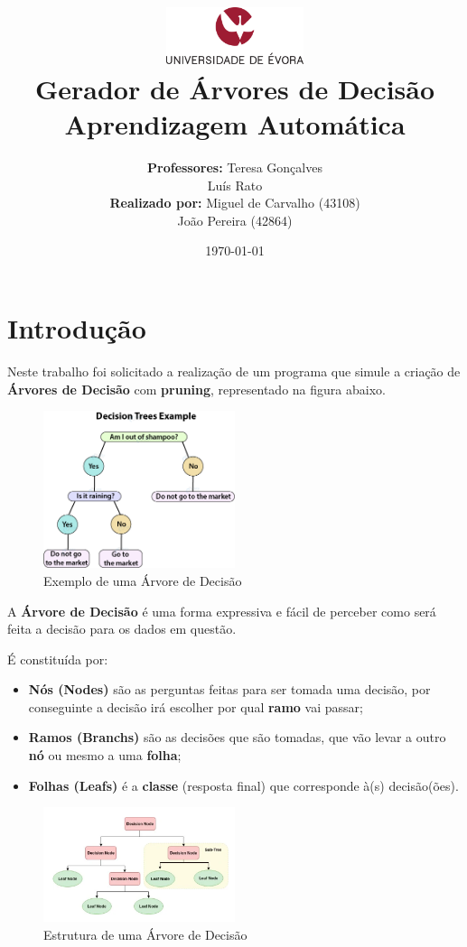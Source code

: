 \documentclass[11pt]{article}   %
\title
{
    \includegraphics[width=0.3\textwidth]{images/logo_universidade.png}
    \\[0.1cm]
    \textbf{Gerador de Árvores de Decisão} \\
    Aprendizagem Automática
}
\author
{
    \textbf{Professores:} Teresa Gonçalves \\ Luís Rato \\
    \textbf{Realizado por:} Miguel de Carvalho (43108) \\ João Pereira (42864) 
}
\date{\today}
\begin{document}
\maketitle

\section{Introdução} 

\hspace{0,5cm}Neste trabalho foi solicitado a realização de um programa que simule a criação de \textbf{Árvores de Decisão} com \textbf{pruning}, representado na figura abaixo. \par
\begin{figure}[h!]
    \begin{center}
	\includegraphics[width=0.5\textwidth]{images/tree-example.png}
        \caption{Exemplo de uma Árvore de Decisão}
    \end{center}
\end{figure}
A \textbf{Árvore de Decisão} é uma forma expressiva e fácil de perceber como será feita a decisão para os dados em questão.


É constituída por:
\begin{itemize}
    \item \textbf{Nós (Nodes)} são as perguntas feitas para ser tomada uma decisão, por conseguinte a decisão irá escolher por qual \textbf{ramo} vai passar;
    \item \textbf{Ramos (Branchs)} são as decisões que são tomadas, que vão levar a outro \textbf{nó} ou mesmo a uma \textbf{folha};
    \item \textbf{Folhas (Leafs)} é a \textbf{classe} (resposta final) que corresponde à(s) decisão(ões).
\end{itemize}
\begin{figure}[h!]
    \begin{center}
	\includegraphics[width=0.5\textwidth]{images/tree-structure.png}
        \caption{Estrutura de uma Árvore de Decisão}
    \end{center}
\end{figure}
\end{document}
